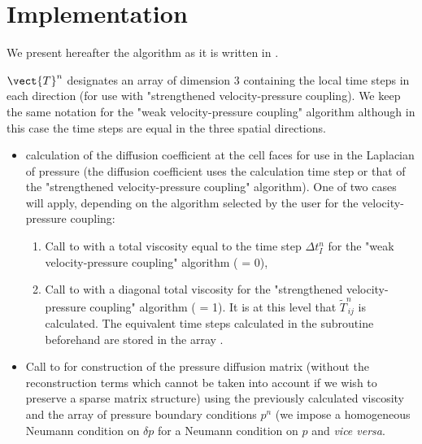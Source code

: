\section*{Implementation}
We present hereafter the algorithm as it is written in .

$\vect{T}^n$ designates an array of dimension $3$ containing the local time steps in each direction (for use with  "strengthened velocity-pressure coupling). We keep the same notation for the "weak velocity-pressure coupling" algorithm although in this case the time steps are equal in the three spatial directions.

\begin{itemize}
\item calculation of the diffusion coefficient at the cell faces for use in the Laplacian of pressure (the diffusion coefficient uses the calculation time step or that of the "strengthened velocity-pressure coupling" algorithm). One of two cases will apply, depending on the algorithm selected by the user for the velocity-pressure coupling:

\begin{enumerate}
\item Call to  with a total viscosity equal to the time step $\Delta t_I^n$ for the "weak velocity-pressure coupling" algorithm ( = 0),
\item Call to  with a diagonal total viscosity for the "strengthened velocity-pressure coupling" algorithm ( = 1). It is at this level that $\widetilde{T}^n_{\,ij}$ is calculated. The equivalent time steps calculated in the subroutine  beforehand are stored in the array .
\end{enumerate}

\item Call to  for construction of the pressure diffusion matrix (without the reconstruction terms which cannot be taken into account if we wish to preserve a sparse matrix structure) using the previously calculated viscosity and the array  of pressure boundary conditions $p^n$ (we impose a homogeneous Neumann condition on $\delta p$ for a Neumann condition on $p$ and \textit{vice versa}.

\end{itemize}

